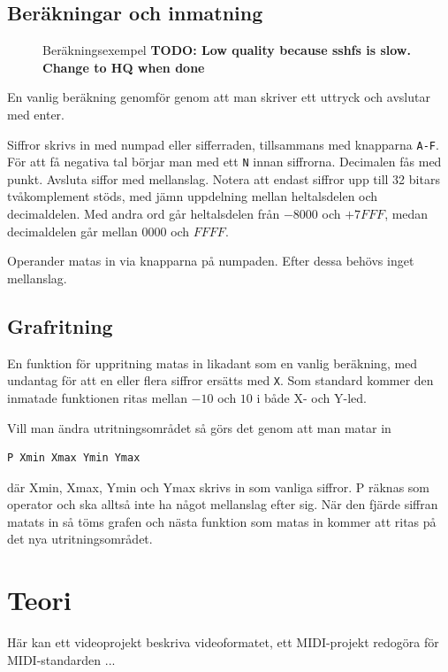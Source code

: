 \documentclass[]{article}
\begin{document}
\subsection{Beräkningar och inmatning}
\begin{figure}[h!]
	\caption{Beräkningsexempel \textbf{TODO: Low quality because sshfs is slow. Change to HQ when done}}
\end{figure}
En vanlig beräkning genomför genom att man skriver ett uttryck och avslutar med enter. 

Siffror skrivs in med numpad eller sifferraden, tillsammans med knapparna \texttt{A-F}. För att få negativa tal börjar man med ett \texttt{N} innan siffrorna. Decimalen fås med punkt. Avsluta siffor med mellanslag. Notera att endast siffror upp till 32 bitars tvåkomplement stöds, med jämn uppdelning mellan heltalsdelen och decimaldelen. Med andra ord går heltalsdelen från $-8000$ och $+7FFF$, medan decimaldelen går mellan $0000$ och $FFFF$.

Operander matas in via knapparna på numpaden. Efter dessa behövs inget mellanslag.

\subsection{Grafritning}
En funktion för uppritning matas in likadant som en vanlig beräkning, med undantag för att en eller flera siffror ersätts med \texttt{X}. Som standard kommer den inmatade funktionen ritas mellan $-10$ och $10$ i både X- och Y-led.

Vill man ändra utritningsområdet så görs det genom att man matar in 
\begin{Verbatim}[frame=single]
P Xmin Xmax Ymin Ymax
\end{Verbatim}
där Xmin, Xmax, Ymin och Ymax skrivs in som vanliga siffror. P räknas som operator och ska alltså inte ha något mellanslag efter sig. När den fjärde siffran matats in så töms grafen och nästa funktion som matas in kommer att ritas på det nya utritningsområdet.

\section{Teori}
Här kan ett videoprojekt beskriva videoformatet, ett MIDI-projekt redogöra för MIDI-standarden ...
\end{document}
